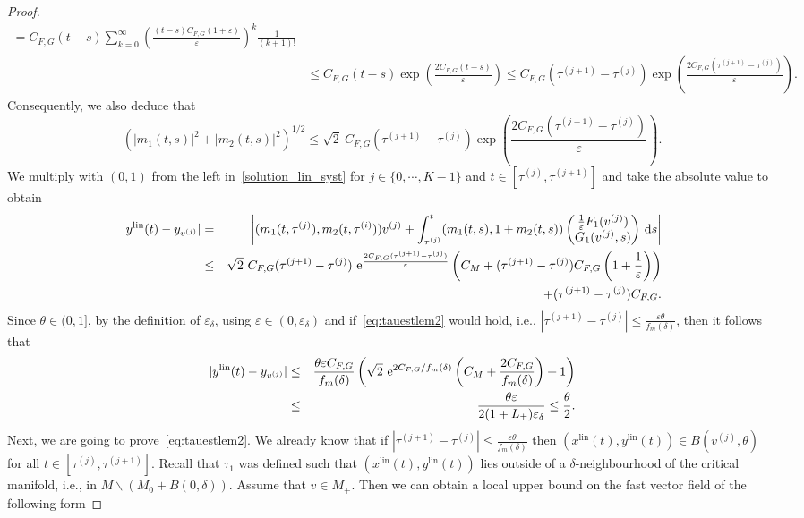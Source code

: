 \documentclass[12pt]{article}
\def\txtd{{\textnormal{d}}}
\def\txte{{\textnormal{e}}}
\newcommand{\beann}{\begin{eqnarray*}}
\newcommand{\eeann}{\end{eqnarray*}}
\newcommand{\benn}{\begin{equation*}}
\newcommand{\eenn}{\end{equation*}}
\begin{document}
\begin{proof}
\begin{align*}
= C_{F,G}(t-s) \sum_{k=0}^\infty \left(\frac{(t-s)C_{F,G}(1+\varepsilon) }{\varepsilon}\right)^k
\frac{1}{(k+1)!} \\
&\leq C_{F,G}(t-s)\exp\left(\frac{2C_{F,G}(t-s)}{\varepsilon}\right) 
\leq C_{F,G}(\tau^{(j+1)}-\tau^{(j)})\exp
\left(\frac{2C_{F,G}(\tau^{(j+1)}-\tau^{(j)})}{\varepsilon}\right).
\end{align*}
Consequently, we also deduce that
\benn
(|m_1(t,s)|^2 + |m_2(t,s)|^2)^{1/2} \leq 
\sqrt{2}~C_{F,G}(\tau^{(j+1)}-\tau^{(j)})
\exp\left(\frac{2C_{F,G}(\tau^{(j+1)}-\tau^{(j)})}{\varepsilon}\right).
\eenn
We multiply with $(0,1)$ from the left in~\eqref{solution_lin_syst} for 
$j\in \{0,\cdots, K-1\}$ and $t\in [\tau^{(j)},\tau^{(j+1)}]$ and take the absolute 
value to obtain
\beann
|y^{\textnormal{lin}}(t)-	y_{v^{(j)}}|
&=& \left|(m_1(t,\tau^{(j)}), m_2(t,\tau^{(i)}))v^{(j)} + \int_{\tau^{(j)}}^{t}
(m_1(t,s), 1+m_2(t,s)) \left(
\begin{matrix}
\frac{1}{\varepsilon}F_1(v^{(j)})\\
G_1(v^{(j)},s)
\end{matrix}\right)
\,\txtd s\right| \\
&\leq& \sqrt{2}~C_{F,G}(\tau^{(j+1)}-\tau^{(j)})
~\txte^{\frac{2C_{F,G}(\tau^{(j+1)}-\tau^{(j)})}{\varepsilon}}
\left(C_M + (\tau^{(j+1)}-\tau^{(j)}) C_{F,G}\left(1+ \frac{1}{\varepsilon}
\right)\right)\\&&+(\tau^{(j+1)}-\tau^{(j)})C_{F,G}.
\eeann
Since $\theta \in (0,1]$, by the definition of $\varepsilon_\delta$, 
using $\varepsilon \in (0,\varepsilon_\delta)$ and if~\eqref{eq:tauestlem2} 
would hold, i.e., $|\tau^{(j+1)}-
\tau^{(j)}|\leq \frac{\varepsilon\theta}{f_m(\delta)}$, then it follows that
\beann
|y^{\textnormal{lin}}(t)-y_{v^{(j)}}| &\leq & 
\frac{\theta\varepsilon C_{F,G}}{f_m(\delta)}\left(\sqrt{2}~ 
\txte^{2C_{F,G}/f_m(\delta)}\left(C_M + \frac{2C_{F,G}}{f_m(\delta)}
\right)+1\right)\\
&\leq& \frac{\theta\varepsilon}{2(1+L_\pm)\varepsilon_\delta}
\leq \frac{\theta}{2}.
\eeann
Next, we are going to prove~\eqref{eq:tauestlem2}. We already know that 
if $|\tau^{(j+1)}-\tau^{(j)}|\leq 
\frac{\varepsilon\theta}{f_m(\delta)}$ then 
$(x^{\mathrm{lin}}(t),y^{\mathrm{lin}}(t))\in B(v^{(j)},\theta)$ 
for all $t\in [\tau^{(j)},\tau^{(j+1)}]$. Recall that $\tau_1$ was defined 
such that $(x^{\mathrm{lin}}(t),y^{\mathrm{lin}}(t))$ lies outside of
a $\delta$-neighbourhood of the critical manifold, i.e., in 
$M\backslash (M_0+B(0,\delta))$. Assume that $v\in M_+$. Then we can obtain 
a local upper bound on the fast vector field of the following form

\end{proof}
\end{document}
